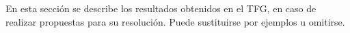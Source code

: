 En esta sección se describe los resultados obtenidos en el TFG, en caso de realizar propuestas para su resolución. Puede sustituirse por ejemplos u omitirse.

